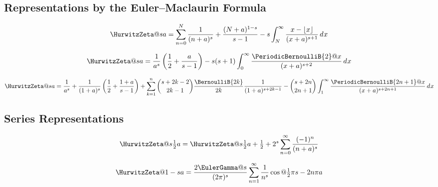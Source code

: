 \documentclass{article}
\begin{document}
\subsection{Representations by the Euler--Maclaurin Formula}
  \label{sec:ZE.HZE.EM}


\begin{equation}\label{eq:ZE.HZE.EM1}
  \HurwitzZeta@{s}{a}
  = \sum_{n=0}^N \frac{1}{(n+a)^s}
  + \frac{(N+a)^{1-s}}{s-1}
  - s \int_N^\infty \frac{x-\floor{x}}{(x+a)^{s+1}} \diff{x}
\end{equation}

\begin{equation}\label{eq:ZE.HZE.EM2}
  \HurwitzZeta@{s}{a}
  = \frac{1}{a^s} \left( \frac{1}{2} + \frac{a}{s-1} \right)
  - s (s+1)
    \int_0^\infty \frac{\PeriodicBernoulliB{2}@{x}}{(x+a)^{s+2}} \diff{x}
\end{equation}

\begin{equation}\label{eq:ZE.HZE.EM3}
  \HurwitzZeta@{s}{a}
  = \frac{1}{a^s}
  + \frac{1}{(1+a)^s} \left( \frac{1}{2} + \frac{1+a}{s-1} \right)
  + \sum_{k=1}^n
        \binom{s+2k-2}{2k-1}
        \frac{\BernoulliB{2k}}{2k}
        \frac{1}{(1+a)^{s+2k-1}}
  - \binom{s+2n}{2n+1}
    \int_1^\infty \frac{\PeriodicBernoulliB{2n+1}@{x}}{(x+a)^{s+2n+1}} \diff{x}
\end{equation}

\subsection{Series Representations}\label{sec:ZE.HZE.SE}


\begin{equation}\label{eq:ZE.HZE.SE1}
  \HurwitzZeta@{s}{\tfrac{1}{2} a}
  = \HurwitzZeta@{s}{\tfrac{1}{2} a + \tfrac{1}{2}}
  + 2^s \sum_{n=0}^\infty \frac{\opminus^n}{(n+a)^s}
\end{equation}

\begin{equation}\label{eq:ZE.HZE.SE2}
  \HurwitzZeta@{1-s}{a}
  = \frac{2\EulerGamma@{s}}{(2\cpi)^s}
  \* \sum_{n=1}^\infty
         \frac{1}{n^s} \cos@{\tfrac{1}{2} \cpi s - 2n \cpi a}
\end{equation}
\end{document}
